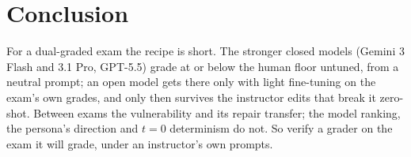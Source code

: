 \section{Conclusion}
\label{sec:Conclusion}
For a dual-graded exam the recipe is short. The stronger closed models (Gemini 3 Flash and 3.1 Pro, GPT-5.5) grade at or below the human floor untuned, from a neutral prompt; an open model gets there only with light fine-tuning on the exam's own grades, and only then survives the instructor edits that break it zero-shot. Between exams the vulnerability and its repair transfer; the model ranking, the persona's direction and $t = 0$ determinism do not. So verify a grader on the exam it will grade, under an instructor's own prompts.
